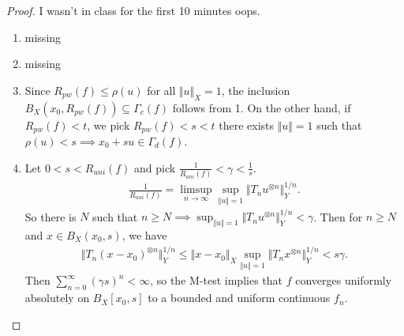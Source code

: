 \documentclass{report}
\begin{document}
\begin{proof}
    I wasn't in class for the first 10 minutes oops.
    \begin{enumerate}
        \item missing
        \item missing
        \item Since $R_{pw}(f) \leq \rho(u)$ for all $\Vert u \Vert_X = 1$, the inclusion $B_X(x_0, R_{pw}(f)) \subseteq \Gamma_c(f)$ follows from 1. On the other hand, if $R_{pw}(f) < t$, we pick $R_{pw}(f) < s < t$ there exists $\Vert u \Vert = 1$ such that $\rho(u)<s \implies x_0 + su \in \Gamma_d(f)$. 
        \item Let $0 < s < R_{uni}(f)$ and pick $\frac{1}{R_{uni}(f)} < \gamma < \frac 1s$. 
        \begin{align*}
            \frac{1}{R_{uni}(f)} = \limsup_{n \to \infty} \sup_{\Vert u\Vert = 1} \Vert T_n u^{\otimes n}\Vert_Y^{1/n}.
        \end{align*}
        So there is $N$ such that $n \geq N \implies \sup_{\Vert u \Vert = 1} \Vert T_n u^{\otimes n} \Vert_Y^{1/n} < \gamma$. Then for $n \geq N$ and $x \in B_X(x_0, s)$, we have 
        \begin{align*}
            \Vert T_n(x - x_0)^{\otimes n}\Vert_Y^{1/n} \leq \Vert x - x_0\Vert_X \sup_{\Vert u \Vert = 1} \Vert T_n x^{\otimes n} \Vert_Y^{1/n} < s\gamma.
        \end{align*}
        Then $\sum_{n=0}^\infty (\gamma s)^n < \infty$, so the M-test implies that $f$ converges uniformly absolutely on $B_X[x_0, s]$ to a bounded and uniform continuous $f_n$.


\end{enumerate}
\end{proof}
\end{document}
